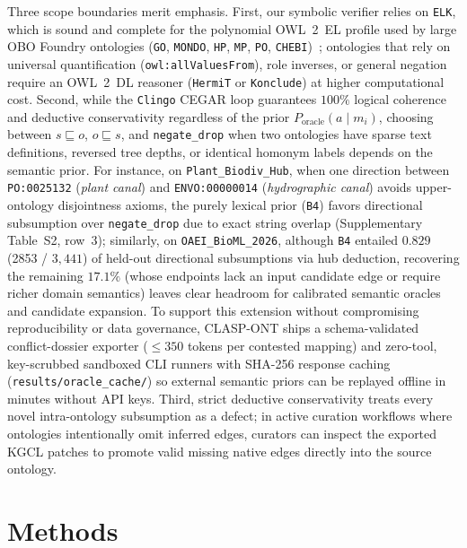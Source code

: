 \documentclass[10pt]{article}
\theoremstyle{accentdef}
\newcommand{\ClaspOAEIBioMLBLexicalLatticeDedSubRecall}{0.829}
\newcommand{\ClaspOAEIBioMLBLexicalLatticeDedSubTP}{2853}
\begin{document}
Three scope boundaries merit emphasis. First, our symbolic verifier relies on \texttt{ELK}, which is sound and complete for the polynomial OWL~2~EL profile used by large OBO Foundry ontologies (\texttt{GO}, \texttt{MONDO}, \texttt{HP}, \texttt{MP}, \texttt{PO}, \texttt{CHEBI})~\cite{kazakov2014elk,baader2005el}; ontologies that rely on universal quantification (\texttt{owl:allValuesFrom}), role inverses, or general negation require an OWL~2~DL reasoner (\texttt{HermiT} or \texttt{Konclude}) at higher computational cost. Second, while the \texttt{Clingo} CEGAR loop guarantees $100\%$ logical coherence and deductive conservativity regardless of the prior $P_{\mathrm{oracle}}(a \mid m_i)$, choosing between $s \sqsubseteq o$, $o \sqsubseteq s$, and \texttt{negate\_drop} when two ontologies have sparse text definitions, reversed tree depths, or identical homonym labels depends on the semantic prior. For instance, on \texttt{Plant\_Biodiv\_Hub}, when one direction between \texttt{PO:0025132} (\emph{plant canal}) and \texttt{ENVO:00000014} (\emph{hydrographic canal}) avoids upper-ontology disjointness axioms, the purely lexical prior (\texttt{B4}) favors directional subsumption over \texttt{negate\_drop} due to exact string overlap (Supplementary Table~S2, row~3); similarly, on \texttt{OAEI\_BioML\_2026}, although \texttt{B4} entailed $\ClaspOAEIBioMLBLexicalLatticeDedSubRecall{}$ (\num{\ClaspOAEIBioMLBLexicalLatticeDedSubTP} / $3{,}441$) of held-out directional subsumptions via hub deduction, recovering the remaining $17.1\%$ (whose endpoints lack an input candidate edge or require richer domain semantics) leaves clear headroom for calibrated semantic oracles and candidate expansion. To support this extension without compromising reproducibility or data governance, \textsc{CLASP-ONT} ships a schema-validated conflict-dossier exporter ($\le 350$ tokens per contested mapping) and zero-tool, key-scrubbed sandboxed CLI runners with SHA-256 response caching (\texttt{results/oracle\_cache/}) so external semantic priors can be replayed offline in minutes without API keys. Third, strict deductive conservativity treats every novel intra-ontology subsumption as a defect; in active curation workflows where ontologies intentionally omit inferred edges, curators can inspect the exported KGCL patches to promote valid missing native edges directly into the source ontology.

\section*{Methods}
\end{document}

